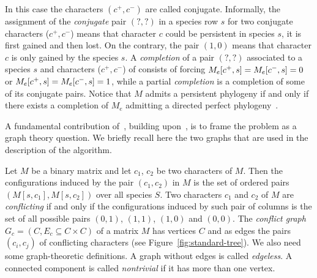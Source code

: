 

In this case the characters $(c^{+}, c^{-})$ are called conjugate.
Informally, the assignment of the \emph{conjugate} pair $(?,?)$ in a species
row $s$ for two conjugate characters ($c^{+}, c^{-}$) means that
character $c$ could be persistent in species $s$, \ie it is first gained and
then lost.
On the contrary, the pair $(1,0)$ means that character $c$ is only gained by
the species $s$.
A \emph{completion}  of  a pair $(?,?)$  associated to a species $s$ and
characters ($c^{+}, c^{-}$) of  \me  consists
of forcing $M_{e} [c^{+},s]=M_{e} [c^{-},s]=0$ or  $M_{e} [c^{+},s]=M_{e} [c^{-},s]=1$,
while a partial \emph{completion}  \me is a completion of some of its conjugate
pairs.
Notice that $M$ admits a persistent phylogeny  if
and only if there exists a completion  of $M_e$ admitting a directed perfect
phylogeny~\cite{DBLP:journals/tcs/BonizzoniBDT12}.





A fundamental contribution of~\cite{DBLP:journals/tcs/BonizzoniBDT12}, building
upon~\cite{Sha}, is to frame the problem as a graph theory question.
We briefly recall here the two graphs that are used in the description of the algorithm.


Let $M$ be a binary matrix and let $c_{1}$, $c_{2}$ be two characters of $M$.
Then the configurations induced by the pair $( c_{1}, c_{2} )$ in $M$ is the
set of ordered pairs $( M[s,c_{1}], M[s,c_{2}])$ over all species $S$.
Two characters $c_{1}$ and $c_{2}$ of $M$ are \emph{conflicting} if and only if
the configurations induced by such pair
of columns is the set of all possible pairs $( 0,1)$, $( 1,1) $, $(1,0) $ and
$( 0,0) $.
The \emph{conflict graph}  $G_c =( C,E_{c}\subseteq C \times C)$ of a matrix $M$
has vertices $C$ and as edges the pairs $(c_{i}, c_{j})$ of conflicting characters (see Figure~\ref{fig:standard-tree}).
%
We also need some graph-theoretic definitions.
A graph without edges is called \emph{edgeless}.
A connected component is called \emph{nontrivial} if it has more than one
vertex.


